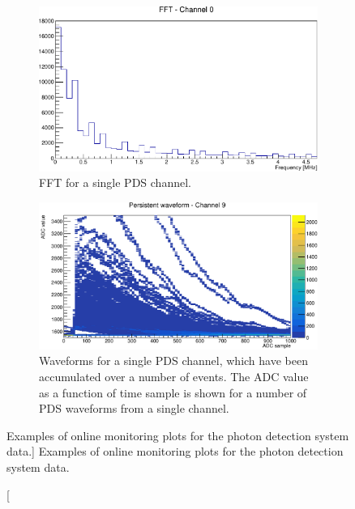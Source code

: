 \begin{figure}

	\centering

	\begin{subfigure}[b]{0.75\textwidth}
		\centering
		\vspace{3mm}
		\includegraphics[width=\textwidth]{figures/pds_fft.pdf}
		\caption {FFT for a single PDS channel.}
		\label{fig:PDS_FFT}
	\end{subfigure}

	\begin{subfigure}[b]{0.75\textwidth}
		\centering
		\vspace{3mm}
		\includegraphics[width=\textwidth]{figures/pds_wav.pdf}
		\caption {Waveforms for a single PDS channel, which have been accumulated
		over a number of events. The ADC value as a function of time sample is shown
		for a number of PDS waveforms from a single channel.}
		\label{fig:PDS_wav}
	\end{subfigure}

	\caption
	[Examples of online monitoring plots for the photon detection system data.]
	{Examples of online monitoring plots for the photon detection system data.}
	\label{fig:pds_om}

\end{figure}

